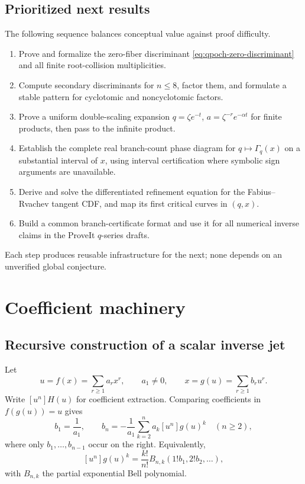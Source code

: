 \documentclass[11pt,letterpaper,oneside,openany]{book}
\theoremstyle{definition}
\theoremstyle{remark}
\begin{document}
\section{Prioritized next results}
The following sequence balances conceptual value against proof difficulty.
\begin{enumerate}
\item Prove and formalize the zero-fiber discriminant
\eqref{eq:qpoch-zero-discriminant} and all finite root-collision
multiplicities.
\item Compute secondary discriminants for \(n\le8\), factor them, and formulate
a stable pattern for cyclotomic and noncyclotomic factors.
\item Prove a uniform double-scaling expansion
\(q=\zeta e^{-t}\), \(a=\zeta^{-r}e^{-\alpha t}\) for finite products, then
pass to the infinite product.
\item Establish the complete real branch-count phase diagram for
\(q\mapsto\Gamma_q(x)\) on a substantial interval of \(x\), using interval
certification where symbolic sign arguments are unavailable.
\item Derive and solve the differentiated refinement equation for the
Fabius--Rvachev tangent CDF, and map its first critical curves in \((q,x)\).
\item Build a common branch-certificate format and use it for all numerical
inverse claims in the ProveIt \(q\)-series drafts.
\end{enumerate}
Each step produces reusable infrastructure for the next; none depends on an
unverified global conjecture.

\appendix

\chapter{Coefficient machinery}

\section{Recursive construction of a scalar inverse jet}
Let
\[
 u=f(x)=\sum_{r\ge1}a_rx^r,
 \qquad a_1\ne0,
 \qquad
 x=g(u)=\sum_{r\ge1}b_ru^r.
\]
Write \([u^n]H(u)\) for coefficient extraction.  Comparing coefficients in
\(f(g(u))=u\) gives
\begin{equation}\label{eq:inverse-coefficient-recursion}
 b_1=\frac1{a_1},
 \qquad
 b_n=-\frac1{a_1}
 \sum_{k=2}^{n}a_k[u^n]g(u)^k
 \quad(n\ge2),
\end{equation}
where only \(b_1,\ldots,b_{n-1}\) occur on the right.  Equivalently,
\[
 [u^n]g(u)^k=\frac{k!}{n!}
 B_{n,k}(1!b_1,2!b_2,\ldots),
\]
with \(B_{n,k}\) the partial exponential Bell polynomial.
\end{document}
